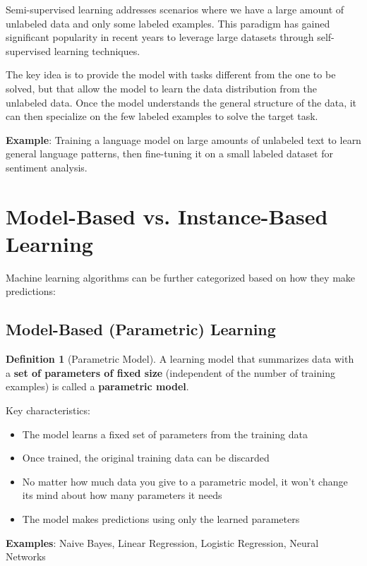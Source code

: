 \documentclass[11pt,a4paper]{article}
\theoremstyle{definition}
\newtheorem{definition}{Definition}[section]
\theoremstyle{plain}
\theoremstyle{remark}
\begin{document}
Semi-supervised learning addresses scenarios where we have a large amount of unlabeled data and only some labeled examples. This paradigm has gained significant popularity in recent years to leverage large datasets through self-supervised learning techniques.

The key idea is to provide the model with tasks different from the one to be solved, but that allow the model to learn the data distribution from the unlabeled data. Once the model understands the general structure of the data, it can then specialize on the few labeled examples to solve the target task.

\textbf{Example}: Training a language model on large amounts of unlabeled text to learn general language patterns, then fine-tuning it on a small labeled dataset for sentiment analysis.

\section{Model-Based vs. Instance-Based Learning}

Machine learning algorithms can be further categorized based on how they make predictions:

\subsection{Model-Based (Parametric) Learning}

\begin{definition}[Parametric Model]
A learning model that summarizes data with a \textbf{set of parameters of fixed size} (independent of the number of training examples) is called a \textbf{parametric model}.
\end{definition}

\begin{tcolorbox}[colback=cyan!5!white,colframe=cyan!75!black,title=\textbf{Parametric Model Characteristics}]
Key characteristics:
\begin{itemize}
    \item The model learns a fixed set of parameters from the training data
    \item Once trained, the original training data can be discarded
    \item No matter how much data you give to a parametric model, it won't change its mind about how many parameters it needs
    \item The model makes predictions using only the learned parameters
\end{itemize}

\textbf{Examples}: Naive Bayes, Linear Regression, Logistic Regression, Neural Networks
\end{tcolorbox}
\end{document}

